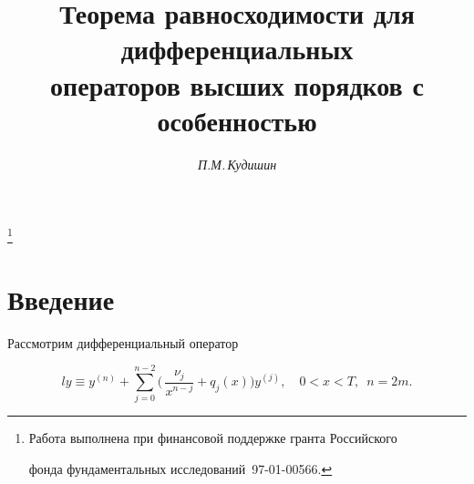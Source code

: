 









\author{\it П.М.\,Кудишин}




\title{Теорема равносходимости для дифференциальных \\


операторов высших порядков с особенностью}





\thanks{Работа выполнена при финансовой поддержке гранта Российского


фонда фундаментальных исследований \No\,97-01-00566.}


\date{}







\pagestyle{plain} %













\maketitle













\section*{Введение}





Рассмотрим дифференциальный оператор


\begin{equation}


ly\equiv y^{(n)}+\sum^{n-2}_{j=0}\biggl(\,


\frac{\nu_j}{x^{n-j}}+q_j(x)\biggr)y^{(j)},\quad


0<x<T,\ \; n=2m.


\end{equation}


